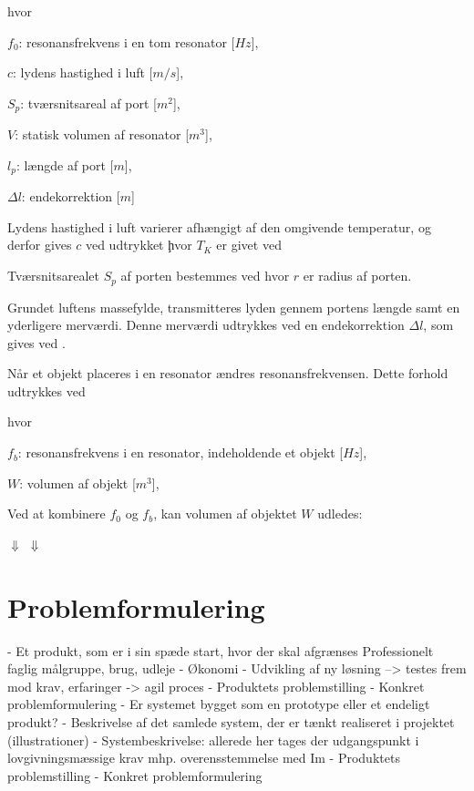 hvor 
\begin{description}[align=left,labelindent=0.3cm]
\item $f_{0}$: resonansfrekvens i en tom resonator [$Hz$],\\
\item $c$: lydens hastighed i luft [$m/s$],\\
\item $S_{p}$: tværsnitsareal af port [$m^2$],\\
\item $V$: statisk volumen af resonator [$m^3$],\\
\item $l_{p}$: længde af port [$m$],\\
\item $\Delta l$: endekorrektion [$m$]\\
\end{description}

Lydens hastighed i luft varierer afhængigt af den omgivende temperatur, og derfor gives $c$ ved udtrykket \c 

hvor $T_{K}$ er givet ved \T

Tværsnitsarealet $S_{p}$ af porten bestemmes ved \Sp 
hvor ${r}$ er radius af porten. 

Grundet luftens massefylde, transmitteres lyden gennem portens længde samt en yderligere merværdi. Denne merværdi udtrykkes ved en endekorrektion $\Delta l$, som gives ved \deltal. 

Når et objekt placeres i en resonator ændres resonansfrekvensen. Dette forhold udtrykkes ved \fb

hvor 
\begin{description}[align=left,labelindent=0.3cm]
\item $f_{b}$: resonansfrekvens i en resonator, indeholdende et objekt [$Hz$],\\
\item $W$: volumen af objekt [$m^3$],\\
\end{description}

Ved at kombinere $f_{0}$ og $f_{b}$, kan volumen af objektet $W$ udledes: 

\Wudl
$\Downarrow$
\Wudled
$\Downarrow$
\W

\section{Problemformulering}
- Et produkt, som er i sin spæde start, hvor der skal afgrænses
 Professionelt faglig målgruppe,  brug, udleje 
- Økonomi 
- Udvikling af ny løsning --> testes frem mod krav, erfaringer -> agil proces
- Produktets problemstilling
- Konkret problemformulering
- Er systemet bygget som en prototype eller et endeligt produkt? 
- Beskrivelse af det samlede system, der er tænkt realiseret i projektet (illustrationer)
- Systembeskrivelse: allerede her tages der udgangspunkt i lovgivningsmæssige krav mhp. overensstemmelse med Im 
- Produktets problemstilling
- Konkret problemformulering

